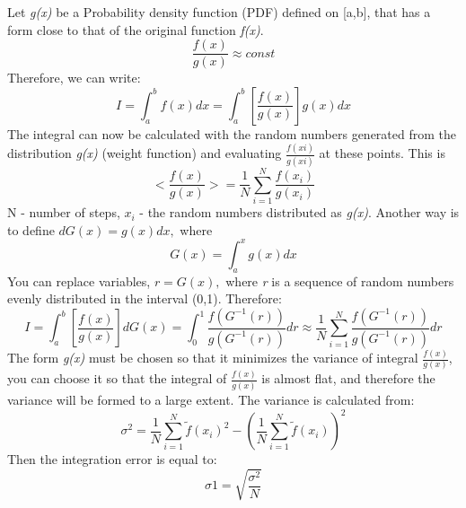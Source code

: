 \documentclass{article}
\begin{document}
Let \textit{g(x)} be a Probability density function (PDF) defined on [a,b], that has a form close to that of the original function \textit{f(x)}. 
\newline
    \begin{equation}\label{eq:fourierrow}
        \frac{f(x)}{g(x)} \approx const
    \end{equation}
\newline
Therefore, we can write:
\newline
    \begin{equation}\label{eq:fourierrow}
        I = \int_{a}^{b}f(x)dx = \int_{a}^{b}[\frac{f(x)}{g(x)}]g(x)dx
    \end{equation}
\newline
The integral can now be calculated with the random numbers generated from the distribution \textit{g(x)} (weight function) and evaluating ${\frac{f(xi)}{g(xi)}}$ at these points.
This is 
\newline
    \begin{equation}\label{eq:fourierrow}
        <\frac{f(x)}{g(x)}>=\frac{1}{N}\sum_{i=1}^{N}\frac{f(x_{i})}{g(x_{i})}
    \end{equation}
\newline
N - number of steps, ${x_{i}}$ - the random numbers distributed as \textit{g(x)}.
\newline 
Another way is to define ${dG(x)=g(x)dx,}$ where 
\newline
    \begin{equation}\label{eq:fourierrow}
        G(x)=\int_{a}^{x}g(x)dx
    \end{equation}
\newline
You can replace variables, ${r=G(x),}$ where \textit{r} is a sequence of random numbers evenly distributed in the interval (0,1). Therefore:
\newline
    \begin{equation}\label{eq:fourierrow}
        I=\int_{a}^{b}[\frac{f(x)}{g(x)}]dG(x)=\int_{0}^{1}\frac{f(G^{-1}(r))}{g(G^{-1}(r))}dr \approx \frac{1}{N}\sum_{i=1}^{N}\frac{f(G^{-1}(r))}{g(G^{-1}(r))}dr
    \end{equation}
\newline
The form \textit{g(x)} must be chosen so that it minimizes the variance of integral ${\frac{f(x)}{g(x)}}$, you can choose it so that the integral of ${\frac{f(x)}{g(x)}}$ is almost flat, and therefore the variance will be formed to a large extent.
\newline
\newline
The variance is calculated from:
\newline
    \begin{equation}\label{eq:fourierrow}
        \sigma^2=\frac{1}{N}\sum_{i=1}^{N}\widetilde{f}(x_{i})^2-(\frac{1}{N}\sum_{i=1}^{N}\widetilde{f}(x_{i}))^2
    \end{equation}
\newline
Then the integration error is equal to:
\newline
    \begin{equation}\label{eq:fourierrow}
        \sigma1=\sqrt{\frac{\sigma^2}{N}}
    \end{equation}
\newline
\end{document}
